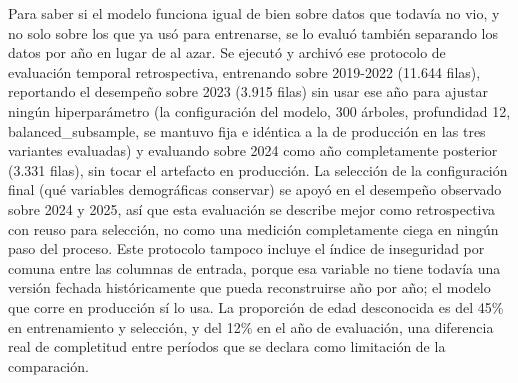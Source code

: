 Para saber si el modelo funciona igual de bien sobre datos que todavía
no vio, y no solo sobre los que ya usó para entrenarse, se lo evaluó
también separando los datos por año en lugar de al azar. Se ejecutó y
archivó ese protocolo de evaluación temporal retrospectiva, entrenando
sobre 2019-2022 (11.644 filas), reportando el desempeño sobre 2023
(3.915 filas) sin usar ese año para ajustar ningún hiperparámetro (la
configuración del modelo, 300 árboles, profundidad 12,
balanced\_subsample, se mantuvo fija e idéntica a la de producción en
las tres variantes evaluadas) y evaluando sobre 2024 como año
completamente posterior (3.331 filas), sin tocar el artefacto en
producción. La selección de la configuración final (qué variables
demográficas conservar) se apoyó en el desempeño observado sobre 2024 y
2025, así que esta evaluación se describe mejor como retrospectiva con
reuso para selección, no como una medición completamente ciega en ningún
paso del proceso. Este protocolo tampoco incluye el índice de
inseguridad por comuna entre las columnas de entrada, porque esa
variable no tiene todavía una versión fechada históricamente que pueda
reconstruirse año por año; el modelo que corre en producción sí lo usa.
La proporción de edad desconocida es del 45\% en entrenamiento y
selección, y del 12\% en el año de evaluación, una diferencia real de
completitud entre períodos que se declara como limitación de la
comparación.

